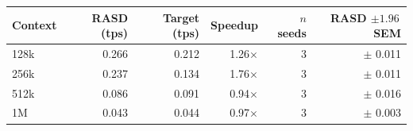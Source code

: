 \begin{tabular}{lrrrrr}
\toprule
Context & RASD (tps) & Target (tps) & Speedup & $n$ seeds & RASD $\pm 1.96\,$SEM \\
\midrule
128k & 0.266 & 0.212 & 1.26$\times$ & 3 & $\pm$ 0.011 \\
256k & 0.237 & 0.134 & 1.76$\times$ & 3 & $\pm$ 0.011 \\
512k & 0.086 & 0.091 & 0.94$\times$ & 3 & $\pm$ 0.016 \\
1M & 0.043 & 0.044 & 0.97$\times$ & 3 & $\pm$ 0.003 \\
\bottomrule
\end{tabular}
